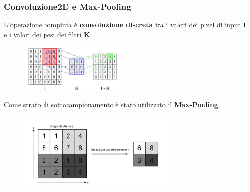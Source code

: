 \documentclass{beamer}
\begin{document}
\begin{frame}
	\frametitle{Convoluzione2D e Max-Pooling}
	
	L'operazione compiuta è \textbf{convoluzione discreta} tra i valori dei pixel di input \textbf{I}
	e i valori dei pesi dei filtri \textbf{K}.



	\begin{figure}
		\includegraphics[width=0.5\textwidth]{convoluzione.PNG}
	\end{figure}
	
Come strato di sottocampionamento è stato utilizzato il \textbf{Max-Pooling}.
	\begin{figure}
		\includegraphics[width=0.7\textwidth]{pooling-ex.PNG}
	\end{figure}
		
	
\end{frame}
\end{document}
